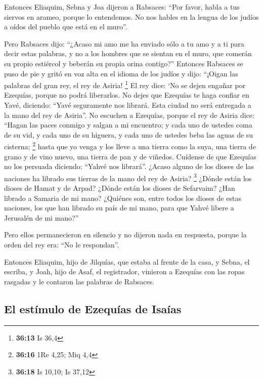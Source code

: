  Entonces Eliaquim, Sebna y Joa dijeron a Rabsaces: ``Por
favor, habla a tus siervos en arameo, porque lo entendemos. No nos
hables en la lengua de los judíos a oídos del pueblo que está en el
muro''.

 Pero Rabsaces dijo: ``¿Acaso mi amo me ha enviado sólo a
tu amo y a ti para decir estas palabras, y no a los hombres que se
sientan en el muro, que comerán su propio estiércol y beberán su propia
orina contigo?''  Entonces Rabsaces se puso de pie y
gritó en voz alta en el idioma de los judíos y dijo: ``¡Oigan las
palabras del gran rey, el rey de Asiria! \footnote{\textbf{36:13} Is
  36,4}  El rey dice: `No se dejen engañar por Ezequías,
porque no podrá liberarlos.  No dejes que Ezequías te
haga confiar en Yavé, diciendo: ``Yavé seguramente nos librará. Esta
ciudad no será entregada a la mano del rey de Asiria''. 
No escuchen a Ezequías, porque el rey de Asiria dice: ``Hagan las paces
conmigo y salgan a mi encuentro; y cada uno de ustedes coma de su vid, y
cada uno de su higuera, y cada uno de ustedes beba las aguas de su
cisterna; \footnote{\textbf{36:16} 1Re 4,25; Miq 4,4} 
hasta que yo venga y los lleve a una tierra como la suya, una tierra de
grano y de vino nuevo, una tierra de pan y de viñedos. 
Cuídense de que Ezequías no los persuada diciendo: ``Yahvé nos
librará''. ¿Acaso alguno de los dioses de las naciones ha librado sus
tierras de la mano del rey de Asiria? \footnote{\textbf{36:18} Is 10,10;
  Is 37,12}  ¿Dónde están los dioses de Hamat y de Arpad?
¿Dónde están los dioses de Sefarvaim? ¿Han librado a Samaria de mi mano?
 ¿Quiénes son, entre todos los dioses de estas naciones,
los que han librado su país de mi mano, para que Yahvé libere a
Jerusalén de mi mano?''

 Pero ellos permanecieron en silencio y no dijeron nada
en respuesta, porque la orden del rey era: ``No le respondan''.

 Entonces Eliaquim, hijo de Jilquías, que estaba al
frente de la casa, y Sebna, el escriba, y Joah, hijo de Asaf, el
registrador, vinieron a Ezequías con las ropas rasgadas y le contaron
las palabras de Rabsaces.

\hypertarget{el-estuxedmulo-de-ezequuxedas-de-isauxedas}{%
\subsection{El estímulo de Ezequías de
Isaías}\label{el-estuxedmulo-de-ezequuxedas-de-isauxedas}}

